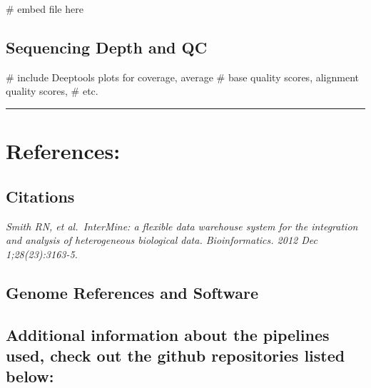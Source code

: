 \documentclass[
]{article}
\newenvironment{Shaded}{\begin{snugshade}}{\end{snugshade}}
\newcommand{\CommentTok}[1]{\textcolor[rgb]{0.48,0.49,0.49}{#1}}
\begin{document}
\begin{Shaded}
\begin{Highlighting}[]
\CommentTok{\# embed file here}
\end{Highlighting}
\end{Shaded}

\hypertarget{sequencing-depth-and-qc}{%
\subsection{Sequencing Depth and QC}\label{sequencing-depth-and-qc}}

\begin{Shaded}
\begin{Highlighting}[]
\CommentTok{\# include Deeptools plots for coverage, average}
\CommentTok{\# base quality scores, alignment quality scores,}
\CommentTok{\# etc.}
\end{Highlighting}
\end{Shaded}

\begin{center}\rule{0.5\linewidth}{0.5pt}\end{center}

\hypertarget{references}{%
\section{References:}\label{references}}

\hypertarget{citations}{%
\subsection{Citations}\label{citations}}

\emph{Smith RN, et al.~InterMine: a flexible data warehouse system for
the integration and analysis of heterogeneous biological data.
Bioinformatics. 2012 Dec 1;28(23):3163-5.}

\hypertarget{genome-references-and-software}{%
\subsection{Genome References and
Software}\label{genome-references-and-software}}

\hypertarget{additional-information-about-the-pipelines-used-check-out-the-github-repositories-listed-below}{%
\subsection{Additional information about the pipelines used, check out
the github repositories listed
below:}\label{additional-information-about-the-pipelines-used-check-out-the-github-repositories-listed-below}}
\end{document}
